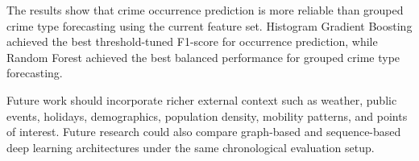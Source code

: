 \documentclass[conference]{IEEEtran}
\begin{document}
The results show that crime occurrence prediction is more reliable than grouped crime type forecasting using the current feature set. Histogram Gradient Boosting achieved the best threshold-tuned F1-score for occurrence prediction, while Random Forest achieved the best balanced performance for grouped crime type forecasting.

Future work should incorporate richer external context such as weather, public events, holidays, demographics, population density, mobility patterns, and points of interest. Future research could also compare graph-based and sequence-based deep learning architectures under the same chronological evaluation setup.



\end{document}
